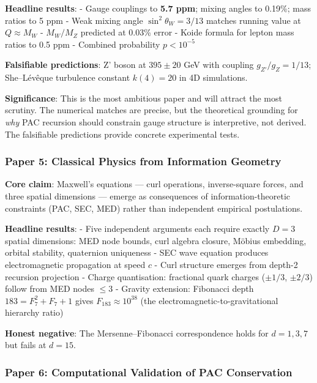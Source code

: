 \documentclass[
  11pt,
  a4paper]{article}
\begin{document}
\textbf{Headline results}: - Gauge couplings to \textbf{5.7 ppm}; mixing
angles to 0.19\%; mass ratios to 5 ppm - Weak mixing angle
\(\sin^2\theta_W = 3/13\) matches running value at \(Q \approx M_W\) -
\(M_W/M_Z\) predicted at 0.03\% error - Koide formula for lepton mass
ratios to 0.5 ppm - Combined probability \(p < 10^{-5}\)

\textbf{Falsifiable predictions}: Z' boson at \(395 \pm 20\) GeV with
coupling \(g_{Z'}/g_Z = 1/13\); She--Lévêque turbulence constant
\(k(4) = 20\) in 4D simulations.

\textbf{Significance}: This is the most ambitious paper and will attract
the most scrutiny. The numerical matches are precise, but the
theoretical grounding for \emph{why} PAC recursion should constrain
gauge structure is interpretive, not derived. The falsifiable
predictions provide concrete experimental tests.

\subsubsection{Paper 5: Classical Physics from Information
Geometry}\label{paper-5-classical-physics-from-information-geometry}

\textbf{Core claim}: Maxwell's equations --- curl operations,
inverse-square forces, and three spatial dimensions --- emerge as
consequences of information-theoretic constraints (PAC, SEC, MED) rather
than independent empirical postulations.

\textbf{Headline results}: - Five independent arguments each require
exactly \(D = 3\) spatial dimensions: MED node bounds, curl algebra
closure, Möbius embedding, orbital stability, quaternion uniqueness -
SEC wave equation produces electromagnetic propagation at speed \(c\) -
Curl structure emerges from depth-2 recursion projection - Charge
quantisation: fractional quark charges (\(\pm 1/3\), \(\pm 2/3\)) follow
from MED nodes \(\leq 3\) - Gravity extension: Fibonacci depth
\(183 = F_7^2 + F_7 + 1\) gives \(F_{183} \approx 10^{38}\) (the
electromagnetic-to-gravitational hierarchy ratio)

\textbf{Honest negative}: The Mersenne--Fibonacci correspondence holds
for \(d = 1, 3, 7\) but fails at \(d = 15\).

\subsubsection{Paper 6: Computational Validation of PAC
Conservation}\label{paper-6-computational-validation-of-pac-conservation}
\end{document}
